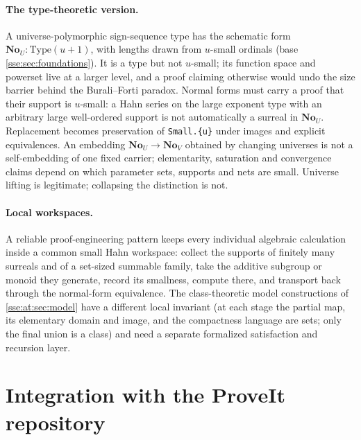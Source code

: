 \documentclass[11pt,a4paper]{article}
\numberwithin{equation}{section}
\theoremstyle{plain}
\theoremstyle{definition}
\theoremstyle{remark}
\newcommand{\No}{\mathbf{No}}
\newcommand{\code}[1]{\texttt{\small #1}}
\begin{document}
\paragraph{The type-theoretic version.} A universe-polymorphic sign-sequence
type has the schematic form $\No_U:\mathrm{Type}(u+1)$, with lengths drawn
from $u$-small ordinals (base \cref{sse:sec:foundations}). It is a type but not
$u$-small; its function space and powerset live at a larger level, and a proof
claiming otherwise would undo the size barrier behind the Burali--Forti
paradox. Normal forms must carry a proof that their support is $u$-small: a
Hahn series on the large exponent type with an arbitrary large well-ordered
support is not automatically a surreal in $\No_U$. Replacement becomes
preservation of \code{Small.\{u\}} under images and explicit equivalences. An
embedding $\No_U\to\No_V$ obtained by changing universes is not a
self-embedding of one fixed carrier; elementarity, saturation and convergence
claims depend on which parameter sets, supports and nets are small. Universe
lifting is legitimate; collapsing the distinction is not.

\paragraph{Local workspaces.} A reliable proof-engineering pattern keeps every
individual algebraic calculation inside a common small Hahn workspace: collect
the supports of finitely many surreals and of a set-sized summable family,
take the additive subgroup or monoid they generate, record its smallness,
compute there, and transport back through the normal-form equivalence. The
class-theoretic model constructions of \cref{sse:at:sec:model} have a different
local invariant (at each stage the partial map, its elementary domain and
image, and the compactness language are sets; only the final union is a
class) and need a separate formalized satisfaction and recursion layer.

\section{Integration with the ProveIt repository}\label{sse:at:sec:lean}
\end{document}
